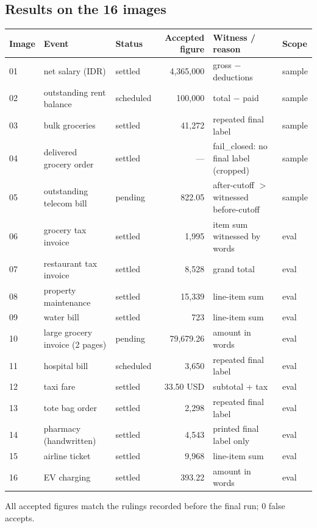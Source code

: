 \documentclass[11pt,a4paper]{article}
\begin{document}
\subsection{Results on the 16 images}
\begin{center}\small
\begin{tabular}{@{}lllrll@{}}
\toprule
Image & Event & Status & Accepted figure & Witness / reason & Scope\\\midrule
01 & net salary (IDR) & settled & 4{,}365{,}000 & gross $-$ deductions & sample\\
02 & outstanding rent balance & scheduled & 100{,}000 & total $-$ paid & sample\\
03 & bulk groceries & settled & 41{,}272 & repeated final label & sample\\
04 & delivered grocery order & settled & --- & fail\_closed: no final label (cropped) & sample\\
05 & outstanding telecom bill & pending & 822.05 & after-cutoff $>$ witnessed before-cutoff & sample\\
06 & grocery tax invoice & settled & 1{,}995 & item sum witnessed by words & eval\\
07 & restaurant tax invoice & settled & 8{,}528 & grand total & eval\\
08 & property maintenance & settled & 15{,}339 & line-item sum & eval\\
09 & water bill & settled & 723 & line-item sum & eval\\
10 & large grocery invoice (2 pages) & pending & 79{,}679.26 & amount in words & eval\\
11 & hospital bill & scheduled & 3{,}650 & repeated final label & eval\\
12 & taxi fare & settled & 33.50 USD & subtotal + tax & eval\\
13 & tote bag order & settled & 2{,}298 & repeated final label & eval\\
14 & pharmacy (handwritten) & settled & 4{,}543 & printed final label only & eval\\
15 & airline ticket & settled & 9{,}968 & line-item sum & eval\\
16 & EV charging & settled & 393.22 & amount in words & eval\\
\bottomrule
\end{tabular}
\end{center}
All accepted figures match the rulings recorded before the final run; 0 false accepts.

\end{document}
